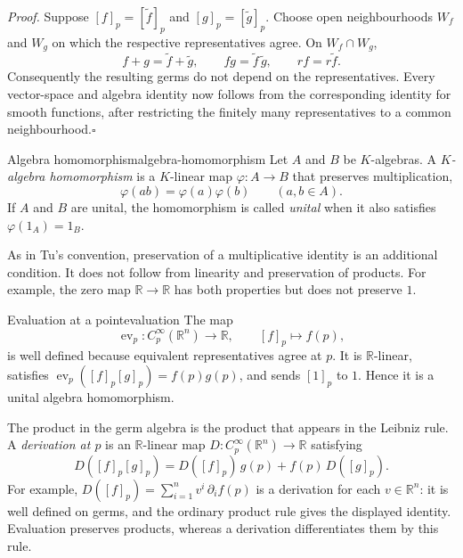 \documentclass[10pt,a4paper]{article}
\newcommand{\R}{\mathbb{R}}
\begin{document}
\textit{Proof.}
Suppose $[f]_p=[\widetilde f]_p$ and $[g]_p=[\widetilde g]_p$. Choose open
neighbourhoods $W_f$ and $W_g$ on which the respective representatives agree.
On $W_f\cap W_g$,
\[
  f+g=\widetilde f+\widetilde g,\qquad
  fg=\widetilde f\,\widetilde g,\qquad
  rf=r\widetilde f.
\]
Consequently the resulting germs do not depend on the representatives.
Every vector-space and algebra identity now follows from the corresponding
identity for smooth functions, after restricting the finitely many
representatives to a common neighbourhood.\hfill$\square$

\begin{definition}{Algebra homomorphism}{algebra-homomorphism}
Let $A$ and $B$ be $K$-algebras. A \emph{$K$-algebra homomorphism} is a
$K$-linear map $\varphi:A\to B$ that preserves multiplication,
\[
  \varphi(ab)=\varphi(a)\varphi(b)\qquad(a,b\in A).
\]
If $A$ and $B$ are unital, the homomorphism is called \emph{unital} when it
also satisfies $\varphi(1_A)=1_B$.
\end{definition}

As in Tu's convention, preservation of a multiplicative identity is an
additional condition. It does not follow from linearity and preservation of
products. For example, the zero map $\R\to\R$ has both properties but does
not preserve $1$.

\begin{examplebox}{Evaluation at a point}{evaluation}
The map
\[
  \operatorname{ev}_p:C_p^\infty(\R^n)\longrightarrow\R,
  \qquad [f]_p\longmapsto f(p),
\]
is well defined because equivalent representatives agree at $p$. It is
$\R$-linear, satisfies
$\operatorname{ev}_p([f]_p[g]_p)=f(p)g(p)$, and sends $[1]_p$ to $1$.
Hence it is a unital algebra homomorphism.
\end{examplebox}

\begin{precision}
The product in the germ algebra is the product that appears in the Leibniz
rule. A \emph{derivation at $p$} is an $\R$-linear map
$D:C_p^\infty(\R^n)\to\R$ satisfying
\[
  D([f]_p[g]_p)=D([f]_p)\,g(p)+f(p)\,D([g]_p).
\]
For example, $D([f]_p)=\sum_{i=1}^n v^i\,\partial_i f(p)$ is a derivation
for each $v\in\R^n$: it is well defined on germs, and the ordinary product
rule gives the displayed identity. Evaluation preserves products, whereas
a derivation differentiates them by this rule.
\end{precision}
\end{document}
